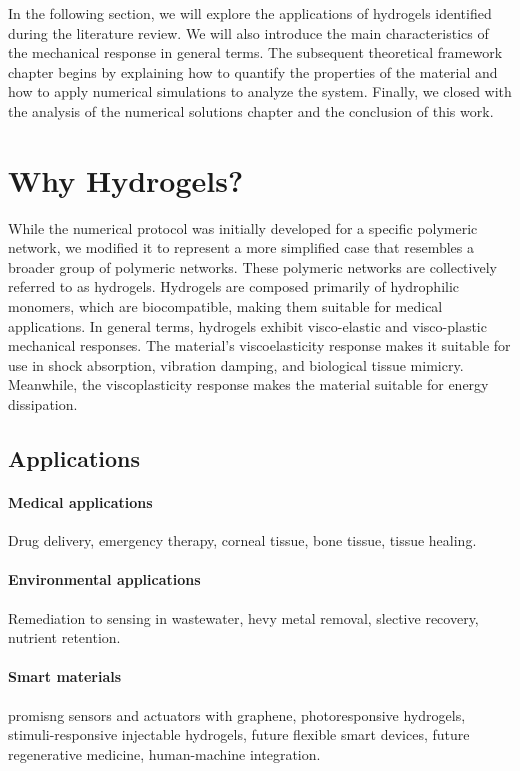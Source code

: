 In the following section, we will explore the applications of hydrogels identified during the literature review. 
We will also introduce the main characteristics of the mechanical response in general terms.
The subsequent theoretical framework chapter begins by explaining how to quantify the properties of the material and how to apply numerical simulations to analyze the system.
Finally, we closed with the analysis of the numerical solutions chapter and the conclusion of this work.

\section{Why Hydrogels?}

While the numerical protocol was initially developed for a specific polymeric network, we modified it to represent a more simplified case that resembles a broader group of polymeric networks.
These polymeric networks are collectively referred to as hydrogels.
Hydrogels are composed primarily of hydrophilic monomers, which are biocompatible, making them suitable for medical applications.
In general terms, hydrogels exhibit visco-elastic and visco-plastic mechanical responses.
The material's viscoelasticity response makes it suitable for use in shock absorption, vibration damping, and biological tissue mimicry.
Meanwhile, the viscoplasticity response makes the material suitable for energy dissipation.

\subsection{Applications}

\paragraph{Medical applications} Drug delivery, emergency therapy, corneal tissue, bone tissue, tissue healing.

\paragraph{Environmental applications} Remediation to sensing in wastewater, hevy metal removal, slective recovery, nutrient retention.

\paragraph{Smart materials} promisng sensors and actuators with graphene, photoresponsive hydrogels, stimuli-responsive injectable hydrogels, future flexible smart devices, future regenerative medicine, human-machine integration.

